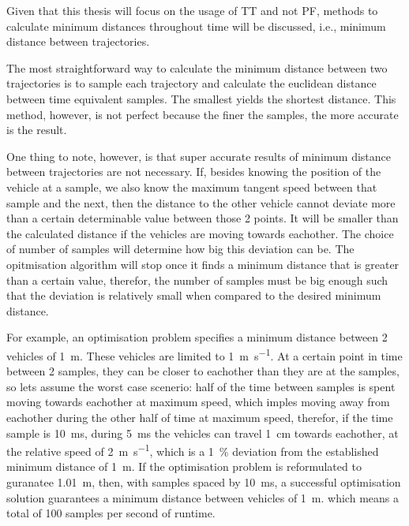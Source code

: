 \par Given that this thesis will focus on the usage of \ac{TT} and not \ac{PF}, methods to calculate minimum distances throughout time will be discussed, i.e., minimum distance between trajectories.
\par The most straightforward way to calculate the minimum distance between two trajectories is to sample each trajectory and calculate the euclidean distance between time equivalent samples. The smallest yields the shortest distance. This method, however, is not perfect because the finer the samples, the more accurate is the result. 
\par One thing to note, however, is that super accurate results of minimum distance between trajectories are not necessary. If, besides knowing the position of the vehicle at a sample, we also know the maximum tangent speed between that sample and the next, then the distance to the other vehicle cannot deviate more than a certain determinable value between those 2 points. It will be smaller than the calculated distance if the vehicles are moving towards eachother. The choice of number of samples will determine how big this deviation can be. The opitmisation algorithm will stop once it finds a minimum distance that is greater than a certain value, therefor, the number of samples must be big enough such that the deviation is relatively small when compared to the desired minimum distance. 
\par For example, an optimisation problem specifies a minimum distance between 2 vehicles of \SI{1}{\meter}. These vehicles are limited to \SI{1}{\meter\per\second}. At a certain point in time between 2 samples, they can be closer to eachother than they are at the samples, so lets assume the worst case scenerio: half of the time between samples is spent moving towards eachother at maximum speed, which imples moving away from eachother during the other half of time at maximum speed, therefor, if the time sample is \SI{10}{\milli\second}, during \SI{5}{\milli\second} the vehicles can travel \SI{1}{\centi\meter} towards eachother, at the relative speed of \SI{2}{\meter\per\second}, which is a \SI{1}{\percent} deviation from the established minimum distance of \SI{1}{\meter}. If the optimisation problem is reformulated to guranatee \SI{1.01}{\meter}, then, with samples spaced by \SI{10}{\milli\second}, a successful optimisation solution guarantees a minimum distance between vehicles of \SI{1}{\meter}. which means a total of 100 samples per second of runtime.



